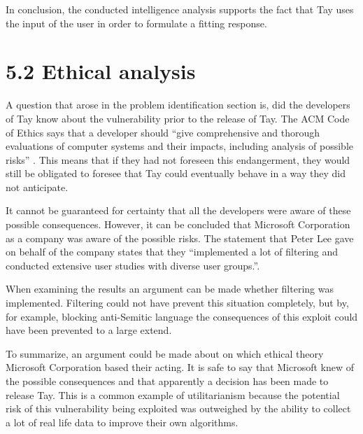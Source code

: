 In conclusion, the conducted intelligence analysis supports the fact that Tay uses the input of the user in order to formulate a fitting response.

\section*{\textbf{5.2 Ethical analysis}}
A question that arose in the problem identification section is, did the developers of Tay know about the vulnerability prior to the release of Tay. The ACM Code of Ethics says that a developer should “give comprehensive and thorough evaluations of computer systems and their impacts, including analysis of possible risks” \cite{ACM}. This means that if they had not foreseen this endangerment, they would still be obligated to foresee that Tay could eventually behave in a way they did not anticipate.

It cannot be guaranteed for certainty that all the developers were aware of these possible consequences. However, it can be concluded that Microsoft Corporation as a company was aware of the possible risks. The statement that Peter Lee gave on behalf of the company states that they “implemented a lot of filtering and conducted extensive user studies with diverse user groups.”\cite{statementpeterlee}.

When examining the results an argument can be made whether filtering was implemented. Filtering could not have prevent this situation completely, but by, for example, blocking anti-Semitic language the consequences of this exploit could have been prevented to a  large extend.

To summarize, an argument could be made about on which ethical theory Microsoft Corporation based their acting. It is safe to say that Microsoft knew of the possible consequences and that apparently a decision has been made to release Tay. This is a common example of utilitarianism because the potential risk of this vulnerability being exploited was outweighed by the ability to collect a lot of real life data to improve their own algorithms.